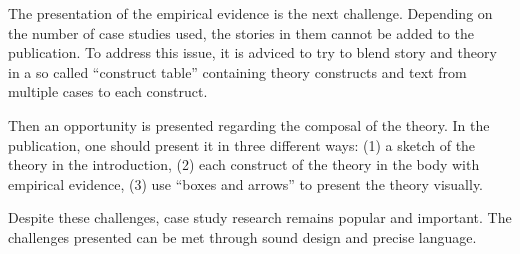 \documentclass[a4paper,12pt,english]{scrartcl}
\begin{document}
The presentation of the empirical evidence is the next challenge. Depending on the number of case studies used, the stories in them cannot be added to the publication. To address this issue, it is adviced to try to blend story and theory in a so called \enquote{construct table} containing theory constructs and text from multiple cases to each construct.

Then an opportunity is presented regarding the composal of the theory. In the publication, one should present it in three different ways: (1) a sketch of the theory in the introduction, (2) each construct of the theory in the body with empirical evidence, (3) use \enquote{boxes and arrows} to present the theory visually.

Despite these challenges, case study research remains popular and important. The challenges presented can be met through sound design and precise language.
\end{document}
